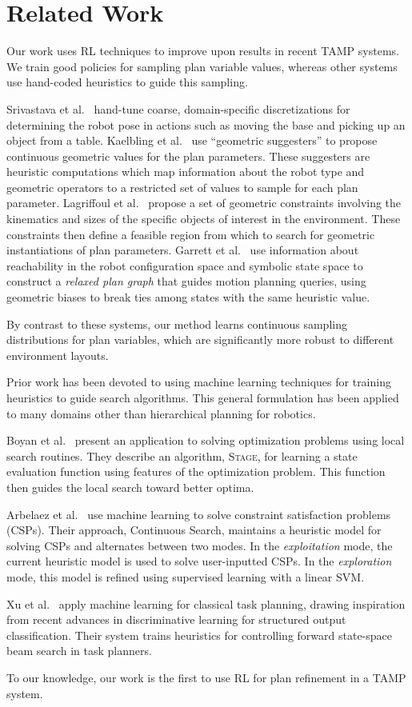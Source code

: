 \section{Related Work}
Our work uses RL techniques to improve upon results in recent TAMP systems.
We train good policies for sampling plan variable values, whereas other
systems use hand-coded heuristics to guide this sampling.

Srivastava et al.~\cite{srivastava2014combined} hand-tune coarse, domain-specific discretizations
for determining the robot pose in actions such as moving the base and picking up an object from a table.
Kaelbling et al.~\cite{kaelbling2011hierarchical} use ``geometric suggesters'' to propose
continuous geometric values for the plan parameters. These suggesters are heuristic
computations which map information about the robot type and geometric operators to a restricted
set of values to sample for each plan parameter. Lagriffoul et al.~\cite{lagriffoul2014orientation}
propose a set of geometric constraints involving the kinematics and sizes of the specific objects of
interest in the environment. These constraints then define a feasible region from which to search
for geometric instantiations of plan parameters. Garrett et al.~\cite{GarrettWAFR14} use information
about reachability in the robot configuration space and symbolic state space to construct a
\emph{relaxed plan graph} that guides motion planning queries, using geometric biases to break ties
among states with the same heuristic value.

By contrast to these systems, our method learns continuous sampling distributions for plan variables,
which are significantly more robust to different environment layouts.

Prior work has been devoted to using machine learning techniques for
training heuristics to guide search algorithms. This general formulation
has been applied to many domains other than hierarchical planning for robotics.

Boyan et al.~\cite{Boyanlearning} present an application to solving optimization
problems using local search routines. They describe an algorithm, \textsc{Stage},
for learning a state evaluation function using features of the optimization problem.
This function then guides the local search toward better optima.

Arbelaez et al.~\cite{hamadisearch} use machine learning to solve constraint
satisfaction problems (CSPs). Their approach, Continuous Search, maintains a heuristic
model for solving CSPs and alternates between two modes. In the \emph{exploitation} mode,
the current heuristic model is used to solve user-inputted CSPs. In the \emph{exploration}
mode, this model is refined using supervised learning with a linear SVM.

Xu et al.~\cite{Xu07discriminativelearning} apply machine learning for classical task
planning, drawing inspiration from recent advances in discriminative learning for
structured output classification. Their system trains heuristics for controlling forward
state-space beam search in task planners.

To our knowledge, our work is the first to use RL for plan refinement in a TAMP system.
